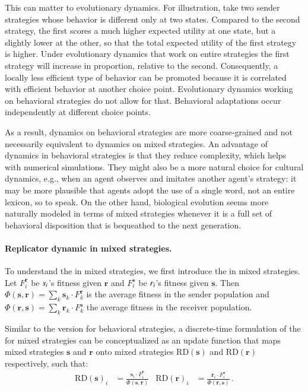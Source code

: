 \documentclass[fleqn,reqno,10pt]{article}
\renewcommand{\Smixed}{\ensuremath{\mathrm{\mathbf{s}}}}
\renewcommand{\Rmixed}{\ensuremath{\mathrm{\mathbf{r}}}}
\newcommand{\rd}{\acro{rd}} %
\newcommand{\rmd}{\acro{rmd}} %
\newcommand{\RD}{\ensuremath{\mathrm{RD}}} %
\begin{document}
This can matter to evolutionary dynamics. For illustration, take two
sender strategies whose behavior is different only at two
states. Compared to the second strategy, the first scores a much
higher expected utility at one state, but a slightly lower at the
other, so that the total expected utility of the first strategy is
higher. Under evolutionary dynamics that work on entire strategies the
first strategy will increase in proportion, relative to the
second. Consequently, a locally less efficient type of behavior can be
promoted because it is correlated with efficient behavior at another
choice point. Evolutionary dynamics working on behavioral strategies
do not allow for that. Behavioral adaptations occur independently at
different choice points.

As a result, dynamics on behavioral strategies are more coarse-grained
and not necessarily equivalent to dynamics on mixed strategies. An
advantage of dynamics in behavioral strategies is that they reduce
complexity, which helps with numerical simulations. They might also be
a more natural choice for cultural dynamics, e.g., when an agent
observes and imitates another agent's strategy: it may be more
plausible that agents adopt the use of a single word, not an entire
lexicon, so to speak. On the other hand, biological evolution seems
more naturally modeled in terms of mixed strategies whenever it is a
full set of behavioral disposition that is bequeathed to the next
generation.

\paragraph{Replicator dynamic in mixed strategies.} To understand the
\rmd in mixed strategies, we first introduce the \rd in mixed
strategies. Let $F_i^{\Rmixed}$ be $s_i$'s fitness given
$\Rmixed$ and $F_i^{\Smixed}$ be $r_i$'s fitness given
$\Smixed$. Then $\Phi(\Smixed,\Rmixed) = \sum_{k} \Smixed_k \cdot
F_k^{\Rmixed}$ is the average fitness in the sender population and
$\Phi(\Rmixed,\Smixed) = \sum_{k} \Rmixed_k \cdot F_k^{\Smixed}$ the
average fitness in the receiver population.

Similar to the version for behavioral strategies, a discrete-time
formulation of the \rd for mixed strategies can be conceptualized as an
update function that maps mixed strategies $\Smixed$ and $\Rmixed$
onto mixed strategies $\RD(\Smixed)$ and $\RD(\Rmixed)$ respectively,
such that:
\begin{align*}
  \RD(\Smixed)_i & = \frac{\Smixed_i \cdot F_i^{\Rmixed}}{
    \Phi(\Smixed,\Rmixed)} & \RD(\Rmixed)_i & = \frac{\Rmixed_i \cdot
    F_i^{\Smixed}}{ \Phi(\Rmixed,\Smixed)} \,.
\end{align*}
\end{document}
